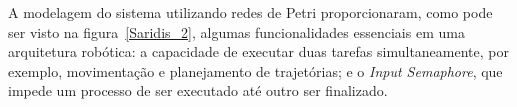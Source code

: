 A modelagem do sistema utilizando redes de Petri proporcionaram, como pode ser
visto na figura~\ref{Saridis_2}, algumas funcionalidades essenciais em uma
arquitetura robótica: a capacidade de executar duas tarefas simultaneamente, por
exemplo, movimentação e planejamento de trajetórias; e o \emph{Input Semaphore},
que impede um processo de ser executado até outro ser finalizado.
  
% 
% 

